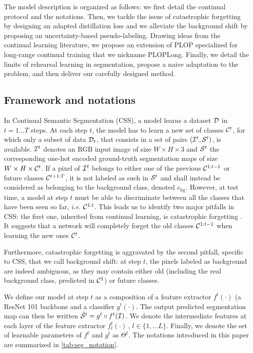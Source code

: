 The model description is organized as follows: we first detail the continual protocol and the
notations. Then, we tackle the issue of catastrophic forgetting by designing an adapted distillation
loss and we alleviate the background shift by proposing an uncertainty-based pseudo-labeling. Drawing
ideas from the continual learning literature, we propose an extension of PLOP specialized for
long-range continual training that we nickname PLOPLong. Finally, we detail the limits of rehearsal
learning in segmentation, propose a naive adaptation to the problem, and then deliver our carefully
designed method.

\subsection{Framework and notations}\label{sec:seg_overview}



In Continual Semantic Segmentation (\ac{CSS}), a model learns a dataset  $\mathcal{D}$ in $t=1 \dots T$ steps.
At each step $t$, the model has to learn a new set of classes $\mathcal{C}^t$, for which only a subset of
data $\mathcal{D}_t$, that consists in a set of pairs $(\mathcal{I}^t, \mathcal{S}^t)$, is available. $\mathcal{I}^t$ denotes an
RGB input image of size $W \times H \times 3$ and $\mathcal{S}^t$ the corresponding one-hot encoded
ground-truth segmentation maps of size $W \times H \times \mathcal{C}^t$. If a pixel of $\mathcal{I}^t$ belongs to
either one of the previous $\mathcal{C}^{1:t-1}$ or future classes $\mathcal{C}^{t+1:T}$, it is not labeled as
such in $\mathcal{S}^t$ and shall instead be considered as belonging to the background class, denoted
$c_\text{bg}$. However, at test time, a model at step $t$ must be able to discriminate between all
the classes that have been seen so far, \textit{i.e.} $\mathcal{C}^{1:t}$. This leads us to identify two
major pitfalls in \ac{CSS}: the first one, inherited from continual learning, is catastrophic forgetting
\cite{robins1995catastrophicforgetting,french1999catastrophicforgetting}. It suggests that a network
will completely forget the old classes $\mathcal{C}^{1:t-1}$ when learning the new ones $\mathcal{C}^t$.

Furthermore, catastrophic forgetting is aggravated by the second pitfall, specific
to \ac{CSS}, that we call background shift: at step $t$, the pixels labeled as background are indeed
ambiguous, as they may contain either old (including the real background class, predicted in
$\mathcal{C}^{1}$) or future classes.



We define our model at step $t$ as a composition of a feature extractor $f^t(\cdot)$ (a ResNet 101
\cite{he2016resnet} backbone and a classifier $g^t(\cdot)$. The output predicted segmentation map
can then be written $\hat{\mathcal{S}}^t = g^t \circ f^t(\mathcal{I})$. We denote the intermediate features at
each layer of the feature extractor $f_l^t(\cdot)\,,\, l \in \{1, \dots L\}$. Finally, we denote the
set of learnable parameters of $f^t$ and $g^t$ as $\Theta^t$. The notations introduced in this paper
are summarized in \autoref{tab:seg_notation}.


